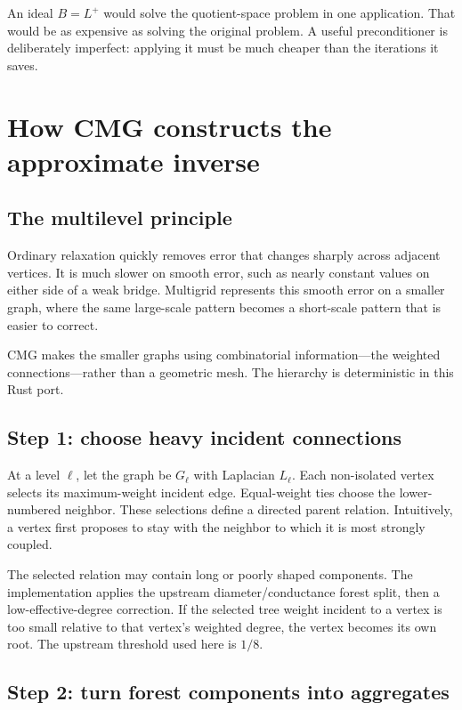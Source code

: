\documentclass[11pt]{article}
\begin{document}
An ideal $B=L^+$ would solve the quotient-space problem in one application.  That would be as expensive as solving the original problem.  A useful preconditioner is deliberately imperfect: applying it must be much cheaper than the iterations it saves.

\section{How CMG constructs the approximate inverse}

\subsection{The multilevel principle}

Ordinary relaxation quickly removes error that changes sharply across adjacent vertices.  It is much slower on smooth error, such as nearly constant values on either side of a weak bridge.  Multigrid represents this smooth error on a smaller graph, where the same large-scale pattern becomes a short-scale pattern that is easier to correct.

CMG makes the smaller graphs using combinatorial information---the weighted connections---rather than a geometric mesh.  The hierarchy is deterministic in this Rust port.

\subsection{Step 1: choose heavy incident connections}

At a level $\ell$, let the graph be $G_\ell$ with Laplacian $L_\ell$.  Each non-isolated vertex selects its maximum-weight incident edge.  Equal-weight ties choose the lower-numbered neighbor.  These selections define a directed parent relation.  Intuitively, a vertex first proposes to stay with the neighbor to which it is most strongly coupled.

The selected relation may contain long or poorly shaped components.  The implementation applies the upstream diameter/conductance forest split, then a low-effective-degree correction.  If the selected tree weight incident to a vertex is too small relative to that vertex's weighted degree, the vertex becomes its own root.  The upstream threshold used here is $1/8$.

\subsection{Step 2: turn forest components into aggregates}
\end{document}
